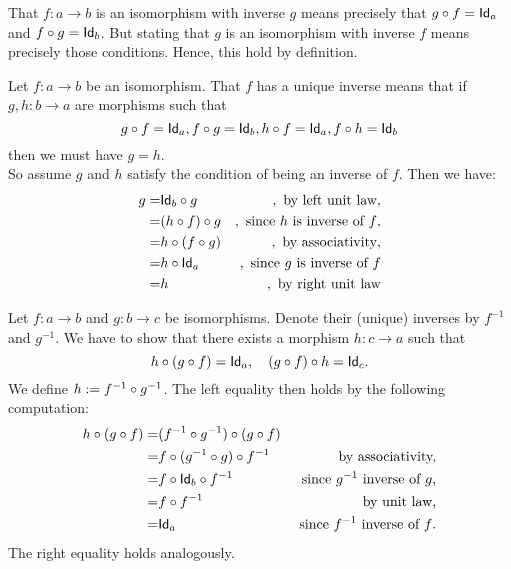 \begin{solution}\label{sol:inverse-iso}
That $f:a\to b$ is an isomorphism with inverse $g$ means precisely that $\co{f}{g} = \Id[a]$ and $\co{g}{f} = \Id[b]$. But stating that $g$ is an isomorphism with inverse $f$ means precisely those conditions. Hence, this hold by definition.
\end{solution}

\begin{solution}\label{sol:inverse_uniqueness}
Let $f:a\to b$ be an isomorphism. That $f$ has a unique inverse means that if $g,h : b\to a$ are morphisms such that 
\[
\co{f}{g} = \Id[a], \co{g}{f} = \Id[b], \co{f}{h} = \Id[a], \co{h}{f} = \Id[b]
\]
then we must have $g = h$.\\
So assume $g$ and $h$ satisfy the condition of being an inverse of $f$. Then we have:
\begin{eqnarray*}
g =& \co{g}{\Id[b]} &,\text{ by left unit law},\\
	=& \co{g}{(\co{f}{h})} &, \text{ since $h$ is inverse of $f$},\\
	=& \co{(\co{g}{f})}{h} &, \text{ by associativity},\\
	=& \co{\Id[a]}{h} &, \text{ since $g$ is inverse of $f$}\\
	=& h &, \text{ by right unit law}
\end{eqnarray*}
\end{solution}

\begin{solution}\label{sol:compofiso}
Let $f: a\to b$ and $g:b\to c$ be isomorphisms. Denote their (unique) inverses by $f^{-1}$ and $g^{-1}$. We have to show that there exists a morphism $h : c\to a$ such that 
\[
\co{(\co{f}{g})}{h} = \Id[a], \quad \co{h}{(\co{f}{g})} = \Id[c].
\]
We define $h := \co{g^{-1}}{f^{-1}}$. The left equality then holds by the following computation:
\begin{eqnarray*}
\co{(\co{f}{g})}{h} =& \co{(\co{f}{g})}{(\co{g^{-1}}{f^{-1}})} &\\
	=& \co{f^{-1}}{\co{(\co{g}{g^{-1}})}{f}} &\text{ by associativity,}\\
	=& \co{f^{-1}}{\co{\Id[b]}{f}} &\text{ since $g^{-1}$ inverse of $g$,}\\
	=& \co{f^{-1}}{f} &\text{ by unit law,}\\
	=& \Id[a] &\text{ since $f^{-1}$ inverse of $f$.}
\end{eqnarray*}
The right equality holds analogously.
\end{solution}


